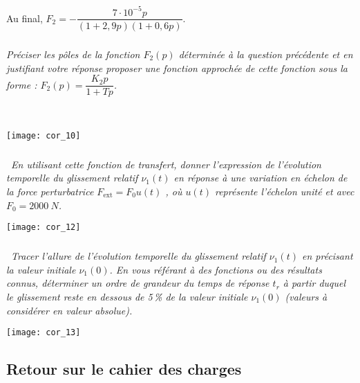 \begin{multicols}{2}
\begin{corrige}
Au final, $F_2 = -\dfrac{7 \cdot 10^{-5}p}{\left(1+2,9 p\right)\left(1+0,6 p\right)}$.
\end{corrige}
\else
\fi



\subparagraph{}\textit{Préciser les pôles de la fonction $F_2(p)$ déterminée à la question précédente et en justifiant votre réponse proposer une fonction approchée de cette fonction sous
la forme : $F_2(p)=\dfrac{K_2p}{1+Tp}$.}
\ifprof
\begin{corrige} ~\\

\begin{center}
\texttt{[image: cor\_10]}
\end{center}

\end{corrige}
\else
\fi


\subparagraph{}\textbf{ \, }\textit{En utilisant cette fonction de transfert, donner l’expression de l’évolution
temporelle du glissement relatif  $\nu_1(t)$ en réponse à une variation en échelon de
la force perturbatrice $F_{\text{ext}}=F_0u(t)$ , où $u(t)$ représente l’échelon unité et avec
$F_0=\SI{2000}{N}$.}
\ifprof
\begin{corrige}

\begin{center}
\texttt{[image: cor\_12]}
\end{center}

\end{corrige}
\else
\fi

\subparagraph{}\textbf{ \, }\textit{Tracer l’allure de l’évolution temporelle du glissement relatif $\nu_1(t)$ en précisant
la valeur initiale $\nu_1(0)$. En vous référant à des fonctions ou des résultats
connus, déterminer un ordre de grandeur du temps de réponse $t_r$ à partir
duquel le glissement reste en dessous de 5\,\% de la valeur initiale $\nu_1(0)$ (valeurs
à considérer en valeur absolue).}
\ifprof
\begin{corrige}
\begin{center}
\texttt{[image: cor\_13]}
\end{center}
\end{corrige}
\else
\fi

\subsection*{Retour sur le cahier des charges}


\end{multicols}
